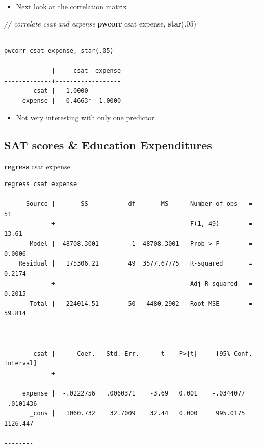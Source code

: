 \documentclass[
]{book}
\newenvironment{Shaded}{\begin{snugshade}}{\end{snugshade}}
\newcommand{\CommentTok}[1]{\textcolor[rgb]{0.56,0.35,0.01}{\textit{#1}}}
\newcommand{\KeywordTok}[1]{\textcolor[rgb]{0.13,0.29,0.53}{\textbf{#1}}}
\newcommand{\NormalTok}[1]{#1}
\providecommand{\tightlist}{%
  \setlength{\itemsep}{0pt}\setlength{\parskip}{0pt}}
\begin{document}
\begin{itemize}
\tightlist
\item
  Next look at the correlation matrix
\end{itemize}

\begin{Shaded}
\begin{Highlighting}[]
  \CommentTok{// correlate csat and expense}
  \KeywordTok{pwcorr}\NormalTok{ csat expense, }\KeywordTok{star}\NormalTok{(.05)}
\end{Highlighting}
\end{Shaded}

\begin{verbatim}

pwcorr csat expense, star(.05)

             |     csat  expense
-------------+------------------
        csat |   1.0000 
     expense |  -0.4663*  1.0000
\end{verbatim}

\begin{itemize}
\tightlist
\item
  Not very interesting with only one predictor
\end{itemize}

\hypertarget{sat-scores-education-expenditures}{%
\subsection{SAT scores \& Education Expenditures}\label{sat-scores-education-expenditures}}

\begin{Shaded}
\begin{Highlighting}[]
  \KeywordTok{regress}\NormalTok{ csat expense}
\end{Highlighting}
\end{Shaded}

\begin{verbatim}
regress csat expense

      Source |       SS           df       MS      Number of obs   =        51
-------------+----------------------------------   F(1, 49)        =     13.61
       Model |  48708.3001         1  48708.3001   Prob > F        =    0.0006
    Residual |   175306.21        49  3577.67775   R-squared       =    0.2174
-------------+----------------------------------   Adj R-squared   =    0.2015
       Total |   224014.51        50   4480.2902   Root MSE        =    59.814

------------------------------------------------------------------------------
        csat |      Coef.   Std. Err.      t    P>|t|     [95% Conf. Interval]
-------------+----------------------------------------------------------------
     expense |  -.0222756   .0060371    -3.69   0.001    -.0344077   -.0101436
       _cons |   1060.732    32.7009    32.44   0.000     995.0175    1126.447
------------------------------------------------------------------------------
\end{verbatim}
\end{document}
